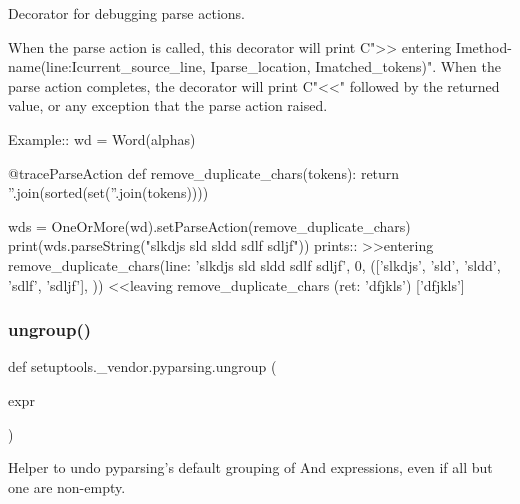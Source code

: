 \begin{DoxyVerb}Decorator for debugging parse actions. 

When the parse action is called, this decorator will print C{">> entering I{method-name}(line:I{current_source_line}, I{parse_location}, I{matched_tokens})".}
When the parse action completes, the decorator will print C{"<<"} followed by the returned value, or any exception that the parse action raised.

Example::
    wd = Word(alphas)

    @traceParseAction
    def remove_duplicate_chars(tokens):
        return ''.join(sorted(set(''.join(tokens))))

    wds = OneOrMore(wd).setParseAction(remove_duplicate_chars)
    print(wds.parseString("slkdjs sld sldd sdlf sdljf"))
prints::
    >>entering remove_duplicate_chars(line: 'slkdjs sld sldd sdlf sdljf', 0, (['slkdjs', 'sld', 'sldd', 'sdlf', 'sdljf'], {}))
    <<leaving remove_duplicate_chars (ret: 'dfjkls')
    ['dfjkls']
\end{DoxyVerb}
 \mbox{\label{namespacesetuptools_1_1__vendor_1_1pyparsing_a4eccbcc70b9c528f34c89347bef1d5c5}} 
\subsubsection{\texorpdfstring{ungroup()}{ungroup()}}
{\footnotesize\ttfamily def setuptools.\+\_\+vendor.\+pyparsing.\+ungroup (\begin{DoxyParamCaption}\item[{}]{expr }\end{DoxyParamCaption})}

\begin{DoxyVerb}Helper to undo pyparsing's default grouping of And expressions, even
if all but one are non-empty.
\end{DoxyVerb}
 \mbox{\label{namespacesetuptools_1_1__vendor_1_1pyparsing_a13346f3af1fe015ad47cc58eafd5e455}} 
